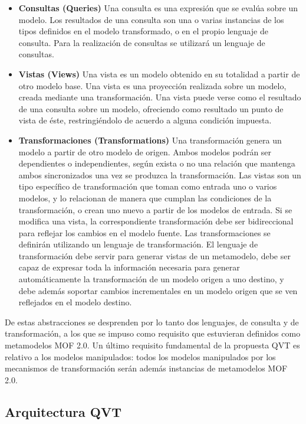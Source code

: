 \begin{itemize}
	\item \textbf{Consultas (Queries)} Una consulta es una expresión que se evalúa sobre un modelo. Los resultados de una consulta son una o varias instancias de los tipos definidos en el modelo transformado, o en el propio lenguaje de consulta. Para la realización de consultas se utilizará un lenguaje de consultas.	 	 	 	
	\item \textbf{Vistas (Views)} Una vista es un modelo obtenido en su totalidad a partir de otro modelo base. Una vista es una proyección realizada sobre un modelo, creada mediante una transformación. Una vista puede verse como el resultado de una consulta sobre un modelo, ofreciendo como resultado un punto de vista de éste, restringiéndolo de acuerdo a alguna condición impuesta.	
	\item \textbf{Transformaciones (Transformations)} Una transformación genera un modelo a partir de otro modelo de origen. Ambos modelos podrán ser dependientes o independientes, según exista o no una relación que mantenga ambos sincronizados una vez se produzca la transformación. Las vistas son un tipo específico de transformación que toman como entrada uno o varios modelos, y lo relacionan de manera que cumplan las condiciones de la transformación, o crean uno nuevo a partir de los modelos de entrada. Si se modifica una vista, la correspondiente transformación debe ser bidireccional para reflejar los cambios en el modelo fuente. Las transformaciones se definirán utilizando un lenguaje de transformación. El lenguaje de transformación debe servir para generar vistas de un metamodelo, debe ser capaz de expresar toda la información necesaria para generar automáticamente la transformación de un modelo origen a uno destino, y debe además soportar cambios incrementales en un modelo origen que se ven reflejados en el modelo destino.
\end{itemize}

De estas abstracciones se desprenden por lo tanto dos lenguajes, de consulta y de transformación, a los que se impuso como requisito que estuvieran definidos como metamodelos MOF 2.0. Un último requisito fundamental de la propuesta QVT es relativo a los modelos manipulados: todos los modelos manipulados por los mecanismos de transformación serán además instancias de metamodelos MOF 2.0.

\subsection{Arquitectura QVT}
\label{Arquitectura QVT}

